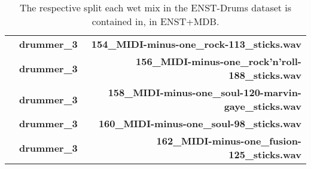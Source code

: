 \begin{table}[H]
\begin{tabular}{l|lr}
            & \textbf{drummer\_3} & \textbf{154\_MIDI-minus-one\_rock-113\_sticks.wav} \\
            & \textbf{drummer\_3} & \textbf{156\_MIDI-minus-one\_rock'n'roll-188\_sticks.wav} \\
            & \textbf{drummer\_3} & \textbf{158\_MIDI-minus-one\_soul-120-marvin-gaye\_sticks.wav} \\
            & \textbf{drummer\_3} & \textbf{160\_MIDI-minus-one\_soul-98\_sticks.wav} \\
            & \textbf{drummer\_3} & \textbf{162\_MIDI-minus-one\_fusion-125\_sticks.wav} \\
    \end{tabular}
    \caption{The respective split each wet mix in the ENST-Drums dataset is contained in, in ENST+MDB.}
    \label{ENSTSplits}
\end{table}